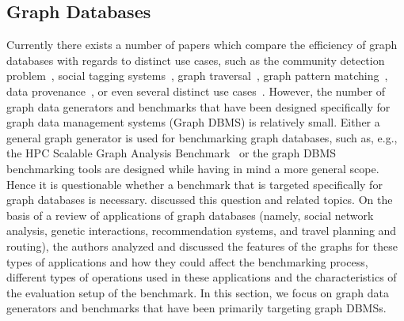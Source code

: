 \subsection{Graph Databases}
\label{sec:generators_GraphDatabases}

Currently there exists a number of papers which compare the efficiency of graph databases with regards to distinct use cases, such as  the community detection problem~\cite{Beis2015}, social tagging systems~\cite{Giatsoglou2011}, graph traversal~\cite{Ciglan:2012:BTO:2374486.2375242}, graph pattern matching~\cite{Pobiedina2014}, data provenance~\cite{Vicknair:2010:CGD:1900008.1900067}, or even several distinct use cases~\cite{Grossniklaus2013Towar-24253}. However, the number of graph data generators and benchmarks that have been designed specifically for graph data management systems (Graph DBMS)  is relatively small. Either a general graph generator is used for benchmarking graph databases, such as, e.g., the HPC Scalable Graph Analysis Benchmark~\cite{Dominguez-Sal:2010:SGD:1927585.1927590} or the graph DBMS benchmarking tools are designed while having in mind a more general scope. Hence it is questionable whether a benchmark  that is targeted specifically for graph databases is necessary. \cite{Dominguez-Sal:2010:DDG:1946050.1946053} discussed this question and related topics. On the basis of a review of applications of graph databases (namely, social network analysis,  genetic interactions, recommendation systems, and travel planning and routing), the authors analyzed and discussed the features of the graphs for these types of applications and how they could affect the benchmarking process, different types of operations used in these applications and the characteristics of the evaluation setup of the benchmark. In this section, we focus on graph data generators and benchmarks that have been primarily targeting graph DBMSs.



